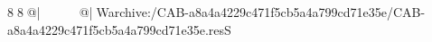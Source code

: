 8  8  @|                                                   @| W   archive:/CAB-a8a4a4229c471f5cb5a4a799cd71e35e/CAB-a8a4a4229c471f5cb5a4a799cd71e35e.resS 